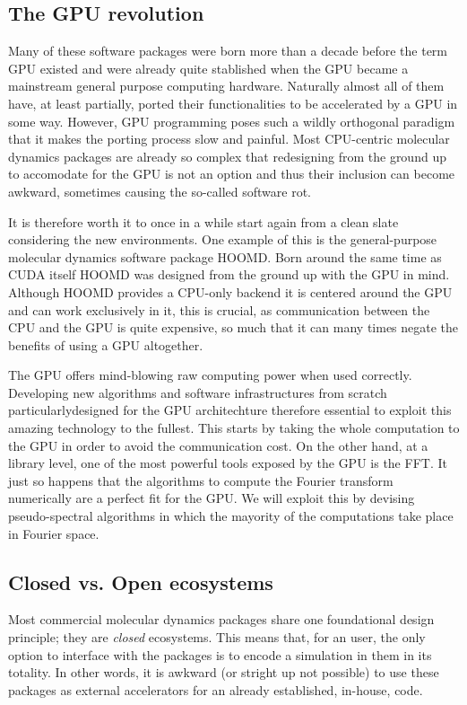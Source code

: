 \documentclass[ twoside,openright,titlepage,numbers=noenddot,%
headinclude,footinclude,cleardoublepage=empty,abstract=on,
BCOR=5mm,paper=a4,fontsize=11pt, dvipsnames
]{scrreprt}
\newcommand{\gpu}{\gls{GPU}\xspace}
\begin{document}
\subsection*{The GPU revolution}
Many of these software packages were born more than a decade before the term \gpu existed and were already quite stablished when the \gpu became a mainstream general purpose computing hardware. Naturally almost all of them have, at least partially, ported their functionalities to be accelerated by a \gpu in some way. However, \gpu programming poses such a wildly orthogonal paradigm that it makes the porting process slow and painful. Most CPU-centric molecular dynamics packages are already so complex that redesigning from the ground up to accomodate for the \gpu is not an option and thus their inclusion can become awkward, sometimes causing the so-called software rot.

It is therefore worth it to once in a while start again from a clean slate considering the new environments. One example of this is the general-purpose molecular dynamics software package HOOMD\cite{Anderson2008}. Born around the same time as CUDA itself HOOMD was designed from the ground up with the \gpu in mind. Although HOOMD provides a CPU-only backend it is centered around the \gpu and can work exclusively in it, this is crucial, as communication between the CPU and the \gpu is quite expensive, so much that it can many times negate the benefits of using a \gpu altogether.

The \gpu offers mind-blowing raw computing power when used correctly. Developing new algorithms and software infrastructures from scratch particularlydesigned for the \gpu architechture therefore essential to exploit this amazing technology to the fullest. This starts by taking the whole computation to the \gpu in order to avoid the communication cost. On the other hand, at a library level, one of the most powerful tools exposed by the \gpu is the \gls{FFT}. It just so happens that the algorithms to compute the Fourier transform numerically are a perfect fit for the \gpu. We will exploit this by devising pseudo-spectral algorithms in which the mayority of the computations take place in Fourier space.

\subsection*{Closed vs. Open ecosystems}
Most commercial molecular dynamics packages share one foundational design principle; they are \emph{closed} ecosystems. This means that, for an user, the only option to interface with the packages is to encode a simulation in them in its totality. In other words, it is awkward (or stright up not possible) to use these packages as external accelerators for an already established, in-house, code.
\end{document}
